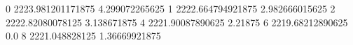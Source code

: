 0 2223.981201171875 4.299072265625
1 2222.664794921875 2.982666015625
2 2222.82080078125 3.138671875
4 2221.90087890625 2.21875
6 2219.68212890625 0.0
8 2221.048828125 1.36669921875
